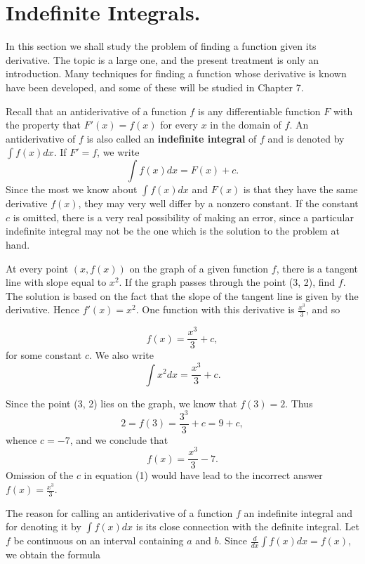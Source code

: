 \section{Indefinite Integrals.} 
In this section we shall study the problem of finding a function given its
derivative. The topic is a large one, and the present treatment is only an introduction. Many techniques for finding a function whose derivative is known have been developed, and some of these will be studied in Chapter 7.

Recall that an antiderivative of a function $f$ is any differentiable function $F$ with the property that $F'(x) = f(x)$ for every $x$ in the domain of $f$. An antiderivative of $f$ is also called an \textbf{indefinite integral} of $f$ and is denoted by $\int f(x) dx$. If $F' = f$, we write
$$
\int f(x) dx = F(x) + c.
$$
\noindent Since the most we know about $\int f(x) dx$ and $F(x)$ is that they have the same derivative $f(x)$, they may very well differ by a nonzero constant. If the constant $c$ is omitted, there is a very real possibility of making an error, since a particular indefinite integral may not be the one which is the solution to the problem at hand.

\begin{example}
At every point $(x,f(x))$ on the graph of a given function $f$, there is a tangent line with slope equal to $x^2$. If the graph passes through the point (3, 2), find $f$. The solution is based on the fact that the slope of the tangent line is given by the derivative. Hence $f'(x) = x^2$. One function with this derivative is $\frac{x^3}{3}$, and so

\begin{equation}
f(x)= \frac{x^3}{3} + c, 
\label{eq4.6.1}
\end{equation}
\noindent for some constant $c$. We also write 
$$
\int x^2 dx = \frac{x^3}{3} + c. 
$$

\noindent Since the point (3, 2) lies on the graph, we know that $f(3) = 2$. Thus
$$
2 = f(3) = \frac{3^3}{3} + c = 9 + c, 
$$
\noindent whence $c = - 7$, and we conclude that
$$
 f(x) = \frac{x^3}{3} - 7. 
$$
\noindent Omission of the $c$ in equation (1) would have lead to the incorrect answer $f(x) = \frac{x^3}{3}$.
\end{example}
\medskip

The reason for calling an antiderivative of a function $f$ an indefinite integral and for denoting it by $\int f(x) dx$ is its close connection with the definite integral. Let $f$ be continuous on an interval containing $a$ and $b$. Since $\frac{d}{dx} {\int f(x) dx} = f(x)$, we obtain the formula

